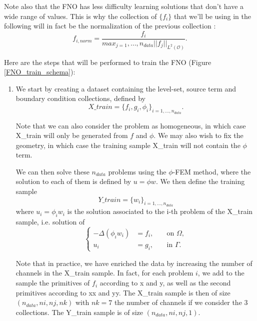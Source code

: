 \begin{Rem}
	Note also that the FNO has less difficulty learning solutions that don't have a wide range of values. This is why the collection of $\{f_i\}$ that we'll be using in the following will in fact be the normalization of the previous collection :
	\begin{equation*}
		f_{i,norm} = \frac{f_i}{max_{j=1},\dots,n_{data} ||f_j||_{L^2(\mathcal{O})}}.
	\end{equation*}
\end{Rem}

Here are the steps that will be performed to train the FNO (Figure \ref{FNO_train_schema}):
\begin{enumerate}[label=\textbullet]
	\item We start by creating a dataset containing the level-set, source term and boundary condition collections, defined by
	\begin{equation*}
		X\_train = \{f_i,g_i,\phi_i\}_{i=1,\dots,n_{data}}.
	\end{equation*}
	\begin{Rem}
		Note that we can also consider the problem as homogeneous, in which case X\_train will only be generated from $f$ and $\phi$. We may also wish to fix the geometry, in which case the training sample X\_train will not contain the $\phi$ term.
	\end{Rem}
	We can then solve these $n_{data}$ problems using the $\phi$-FEM method, where the solution to each of them is defined by $u=\phi w$. We then define the training sample
	\begin{equation*}
		Y\_train=\{w_i\}_{i=1,\dots,n_{data}}
	\end{equation*}
	where $u_i = \phi_i w_i$ is the solution associated to the i-th problem of the X\_train sample, i.e. solution of
	\begin{equation*}
		\left\{\begin{aligned}
			-\Delta (\phi_i w_i)&=f_i, \; &&\text{on } \Omega, \\
			u_i&=g_i, \; &&\text{in } \Gamma.
		\end{aligned}\right.
	\end{equation*}
	\begin{Rem}
		Note that in practice, we have enriched the data by increasing the number of channels in the X\_train sample. In fact, for each problem $i$, we add to the sample the primitives of $f_i$ according to x and y, as well as the second primitives according to xx and yy. The X\_train sample is then of size $(n_{data},ni,nj,nk)$ with $nk=7$ the number of channels if we consider the 3 collections. The Y\_train sample is of size $(n_{data},ni,nj,1)$.

\end{Rem}
\end{enumerate}
